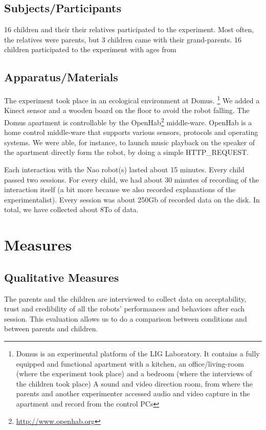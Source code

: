 \documentclass[smallextended]{svjour3}
\begin{document}
\subsection{Subjects/Participants}
16 children and their their relatives participated to the experiment. 
Most often, the relatives were parents, but 3 children came with their grand-parents.
16 children participated to the experiment with ages from  

\subsection{Apparatus/Materials}
The experiment took place in an ecological environment at Domus.
\footnote{Domus is an experimental platform of the LIG Laboratory.
	It contains a fully equipped and functional apartment with a kitchen, an office/living-room (where the experiment took place) and  a bedroom (where the interviews of the children took place)
	A sound and video direction room, from where the parents and another experimenter accessed audio and video capture in the apartment and record from the control PCs}
We added a Kinect sensor and a wooden board on the floor to avoid the robot falling. 
The Domus apartment is controllable by the OpenHab\footnote{\url{http://www.openhab.org}} middle-ware. 
OpenHab is a home control middle-ware that supports various sensors, protocols and operating systems. 
We were able, for instance, to launch music playback on the speaker of the apartment directly form the robot, by doing a simple HTTP\_REQUEST. 

Each interaction with the Nao robot(s) lasted about 15 minutes. 
Every child passed two sessions. 
For every child, we had about 30 minutes of recording of the interaction itself (a bit more because we also recorded explanations of the experimentalist). 
Every session was about 250Gb of recorded data on the disk. 
In total, we have collected about 8To of data. 


\section{Measures}
\subsection{Qualitative Measures}
The parents and the children are interviewed to collect data on acceptability, trust and  credibility of all the robots' performances and behaviors after each session. 
This evaluation allows us to do a comparison between conditions and between parents and children.
\end{document}

